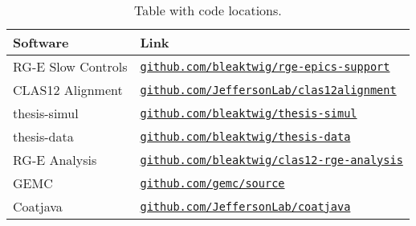         \begin{table}[b!]
            \begin{center}
                \begin{tabularx}{0.90\textwidth}{ll}
                    \toprule
                    \textbf{Software}  & \textbf{Link} \\
                    \midrule \midrule
                    RG-E Slow Controls &
                        \href{https://github.com/bleaktwig/rge-epics-support}
                        {\texttt{github.com/bleaktwig/rge-epics-support}} \\
                    \midrule
                    CLAS12 Alignment   &
                        \href{https://github.com/JeffersonLab/clas12alignment}
                        {\texttt{github.com/JeffersonLab/clas12alignment}} \\
                    \midrule
                    thesis-simul       &
                        \href{https://github.com/bleaktwig/thesis-simul}
                        {\texttt{github.com/bleaktwig/thesis-simul}} \\
                    thesis-data        &
                        \href{https://github.com/bleaktwig/thesis-data}
                        {\texttt{github.com/bleaktwig/thesis-data}} \\
                    RG-E Analysis      &
                        \href{https://github.com/bleaktwig/clas12-rge-analysis}
                        {\texttt{github.com/bleaktwig/clas12-rge-analysis}} \\
                    GEMC               &
                        \href{https://github.com/gemc/source}
                        {\texttt{github.com/gemc/source}} \\
                    Coatjava           &
                        \href{https://github.com/JeffersonLab/coatjava}
                        {\texttt{github.com/JeffersonLab/coatjava}} \\
                \bottomrule
            \end{tabularx}
        \end{center}

        \caption{Table with code locations.}
        \label{tab::20.01::code_locations}
    \end{table}
